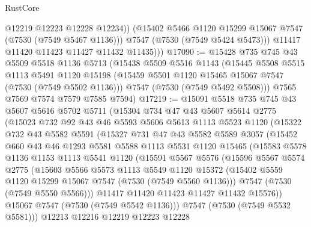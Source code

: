 \begin{lexlean}{RustCore}
\begin{coremodule}
                @12219
                @12223
                @12228
                @12234))
            (@15402 @5466 @1120 @15299 @15067 @7547 (@7530 (@7549 @5467 @1136)))
            @7547
            (@7530 (@7549 @5424 @5473)))
          @11417
          @11420
          @11423
          @11427
          @11432
          @11435)))
@17090 := @15428
    @735
    @745
    @43
    @5509
    @5518
    @1136
    @5713
    (@15438
      @5509
      @5516
      @1143
      (@15445
        @5508
        @5515
        @1113
        @5491
        @1120
        @15198
        (@15459 @5501 @1120 @15465 @15067 @7547 (@7530 (@7549 @5502 @1136)))
        @7547
        (@7530 (@7549 @5492 @5508)))
      @7565
      @7569
      @7574
      @7579
      @7585
      @7594)
@17219 := @15091
    @5518
    @735
    @745
    @43
    @5607
    @5616
    @5702
    @5711
    (@15304
      @734
      @47
      @43
      @5607
      @5614
      @2775
      (@15023
        @732
        @92
        @43
        @46
        @5593
        @5606
        @5613
        @1113
        @5523
        @1120
        (@15322
          @732
          @43
          @5582
          @5591
          (@15327
            @731
            @47
            @43
            @5582
            @5589
            @3057
            (@15452
              @660
              @43
              @46
              @1293
              @5581
              @5588
              @1113
              @5531
              @1120
              @15465
              (@15583
                @5578
                @1136
                @1153
                @1113
                @5541
                @1120
                (@15591
                  @5567
                  @5576
                  (@15596
                    @5567
                    @5574
                    @2775
                    (@15603
                      @5566
                      @5573
                      @1113
                      @5549
                      @1120
                      @15372
                      (@15402 @5559 @1120 @15299 @15067 @7547 (@7530 (@7549 @5560 @1136)))
                      @7547
                      (@7530 (@7549 @5550 @5566)))
                    @11417
                    @11420
                    @11423
                    @11427
                    @11432
                    @15576))
                @15067
                @7547
                (@7530 (@7549 @5542 @1136)))
              @7547
              (@7530 (@7549 @5532 @5581)))
            @12213
            @12216
            @12219
            @12223
            @12228

\end{coremodule}
\end{lexlean}
